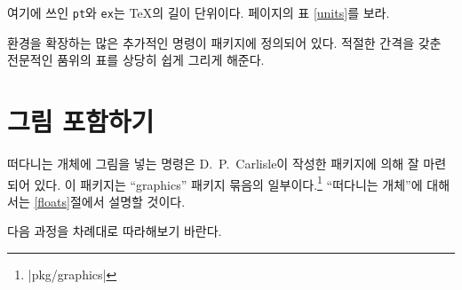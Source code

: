 여기에 쓰인 \texttt{pt}와 \texttt{ex}는 \TeX 의 길이 단위이다. \pageref{units}페이지의 표 \ref{units}를 보라.

 환경을 확장하는 많은 추가적인 명령이  패키지에 정의되어 있다.
적절한 간격을 갖춘 전문적인 품위의 표를 상당히 쉽게 그리게 해준다.


\section{그림 포함하기}\label{eps}


떠다니는 개체에 그림을 넣는 명령은 D.~P.~Carlisle이 작성한  패키지에 의해 잘 마련되어 있다.
이 패키지는 ``graphics'' 패키지 묶음의 일부이다.\footnote{\CTAN|pkg/graphics|}
``떠다니는 개체''에 대해서는 \ref{floats}절에서 설명할 것이다.

다음 과정을 차례대로 따라해보기 바란다.

\enlargethispage*{2\onelineskip}


